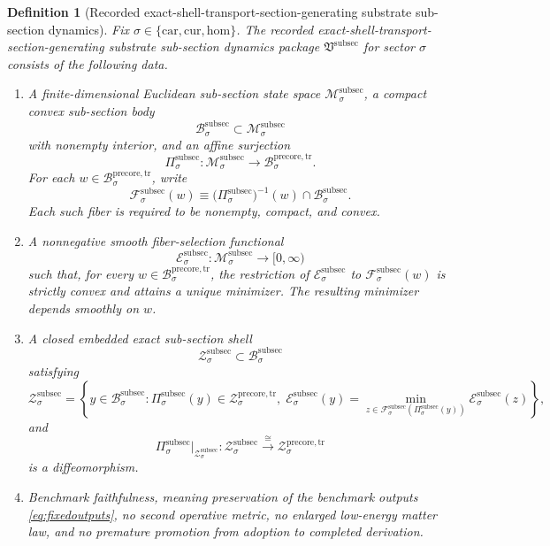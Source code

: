 \documentclass[11pt]{article}
\newcommand{\Car}{\mathrm{car}}
\newcommand{\Cur}{\mathrm{cur}}
\newcommand{\Hom}{\mathrm{hom}}
\newcommand{\PreCoreTrBody}[1]{\mathcal B_{#1}^{\mathrm{precore,tr}}}
\newcommand{\PreCoreTrShell}[1]{\mathcal Z_{#1}^{\mathrm{precore,tr}}}
\newcommand{\SubSectionPackage}{\mathfrak V^{\mathrm{subsec}}}
\newcommand{\SubSectionSpace}[1]{\mathcal M_{#1}^{\mathrm{subsec}}}
\newcommand{\SubSectionBody}[1]{\mathcal B_{#1}^{\mathrm{subsec}}}
\newcommand{\SubSectionProj}[1]{\Pi_{#1}^{\mathrm{subsec}}}
\newcommand{\SubSectionFiber}[2]{\mathcal F_{#1}^{\mathrm{subsec}}(#2)}
\newcommand{\SubSectionFunctional}[1]{\mathscr E_{#1}^{\mathrm{subsec}}}
\newcommand{\SubSectionShell}[1]{\mathcal Z_{#1}^{\mathrm{subsec}}}
\newtheorem{definition}{Definition}
\begin{document}
\begin{definition}[Recorded exact-shell-transport-section-generating substrate sub-section dynamics]
\label{def:subsec}
Fix \(\sigma\in\{\Car,\Cur,\Hom\}\). The recorded exact-shell-transport-section-generating substrate sub-section dynamics package \(\SubSectionPackage\) for sector \(\sigma\) consists of the following data.
\begin{enumerate}
    \item A finite-dimensional Euclidean sub-section state space \(\SubSectionSpace{\sigma}\), a compact convex sub-section body
    \[
    \SubSectionBody{\sigma}\subset\SubSectionSpace{\sigma}
    \]
    with nonempty interior, and an affine surjection
    \[
    \SubSectionProj{\sigma}:\SubSectionSpace{\sigma}\to\PreCoreTrBody{\sigma}.
    \]
    For each \(w\in\PreCoreTrBody{\sigma}\), write
    \[
    \SubSectionFiber{\sigma}{w}
    \equiv
    \bigl(\SubSectionProj{\sigma}\bigr)^{-1}(w)\cap\SubSectionBody{\sigma}.
    \]
    Each such fiber is required to be nonempty, compact, and convex.
    \item A nonnegative smooth fiber-selection functional
    \[
    \SubSectionFunctional{\sigma}:\SubSectionSpace{\sigma}\to[0,\infty)
    \]
    such that, for every \(w\in\PreCoreTrBody{\sigma}\), the restriction of \(\SubSectionFunctional{\sigma}\) to \(\SubSectionFiber{\sigma}{w}\) is strictly convex and attains a unique minimizer. The resulting minimizer depends smoothly on \(w\).
    \item A closed embedded exact sub-section shell
    \[
    \SubSectionShell{\sigma}\subset\SubSectionBody{\sigma}
    \]
    satisfying
    \[
    \SubSectionShell{\sigma}
    =
    \left\{
    y\in\SubSectionBody{\sigma}:
    \SubSectionProj{\sigma}(y)\in\PreCoreTrShell{\sigma},
    \;
    \SubSectionFunctional{\sigma}(y)
    =
    \min_{z\in\SubSectionFiber{\sigma}{\SubSectionProj{\sigma}(y)}}
    \SubSectionFunctional{\sigma}(z)
    \right\},
    \]
    and
    \[
    \SubSectionProj{\sigma}\big|_{\SubSectionShell{\sigma}}
    :
    \SubSectionShell{\sigma}
    \xrightarrow{\cong}
    \PreCoreTrShell{\sigma}
    \]
    is a diffeomorphism.
    \item Benchmark faithfulness, meaning preservation of the benchmark outputs \eqref{eq:fixedoutputs}, no second operative metric, no enlarged low-energy matter law, and no premature promotion from adoption to completed derivation.
\end{enumerate}
\end{definition}
\end{document}
